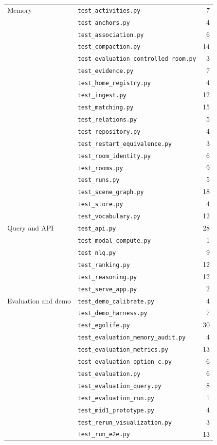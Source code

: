 \begin{ltab}
\begin{longtable}{@{}L{4.0cm}L{6.4cm}r@{}}
Memory & \texttt{test\_activities.py} & 7\\
 & \texttt{test\_anchors.py} & 4\\
 & \texttt{test\_association.py} & 6\\
 & \texttt{test\_compaction.py} & 14\\
 & \texttt{test\_evaluation\_controlled\_room.py} & 3\\
 & \texttt{test\_evidence.py} & 7\\
 & \texttt{test\_home\_registry.py} & 4\\
 & \texttt{test\_ingest.py} & 12\\
 & \texttt{test\_matching.py} & 15\\
 & \texttt{test\_relations.py} & 5\\
 & \texttt{test\_repository.py} & 4\\
 & \texttt{test\_restart\_equivalence.py} & 3\\
 & \texttt{test\_room\_identity.py} & 6\\
 & \texttt{test\_rooms.py} & 9\\
 & \texttt{test\_runs.py} & 5\\
 & \texttt{test\_scene\_graph.py} & 18\\
 & \texttt{test\_store.py} & 4\\
 & \texttt{test\_vocabulary.py} & 12\\
\midrule
Query and API & \texttt{test\_api.py} & 28\\
 & \texttt{test\_modal\_compute.py} & 1\\
 & \texttt{test\_nlq.py} & 9\\
 & \texttt{test\_ranking.py} & 12\\
 & \texttt{test\_reasoning.py} & 12\\
 & \texttt{test\_serve\_app.py} & 2\\
\midrule
Evaluation and demo & \texttt{test\_demo\_calibrate.py} & 4\\
 & \texttt{test\_demo\_harness.py} & 7\\
 & \texttt{test\_egolife.py} & 30\\
 & \texttt{test\_evaluation\_memory\_audit.py} & 4\\
 & \texttt{test\_evaluation\_metrics.py} & 13\\
 & \texttt{test\_evaluation\_option\_c.py} & 6\\
 & \texttt{test\_evaluation.py} & 6\\
 & \texttt{test\_evaluation\_query.py} & 8\\
 & \texttt{test\_evaluation\_run.py} & 1\\
 & \texttt{test\_mid1\_prototype.py} & 4\\
 & \texttt{test\_rerun\_visualization.py} & 3\\
 & \texttt{test\_run\_e2e.py} & 13\\

\end{longtable}
\end{ltab}
